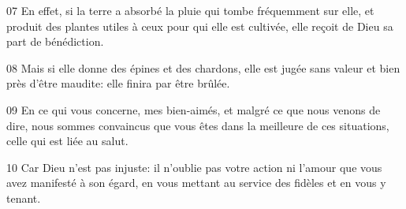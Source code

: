 
07 En effet, si la terre a absorbé la pluie qui tombe fréquemment sur elle, et produit des plantes utiles à ceux pour qui elle est cultivée, elle reçoit de Dieu sa part de bénédiction.

08 Mais si elle donne des épines et des chardons, elle est jugée sans valeur et bien près d’être maudite: elle finira par être brûlée.

09 En ce qui vous concerne, mes bien-aimés, et malgré ce que nous venons de dire, nous sommes convaincus que vous êtes dans la meilleure de ces situations, celle qui est liée au salut.

10 Car Dieu n’est pas injuste: il n’oublie pas votre action ni l’amour que vous avez manifesté à son égard, en vous mettant au service des fidèles et en vous y tenant.